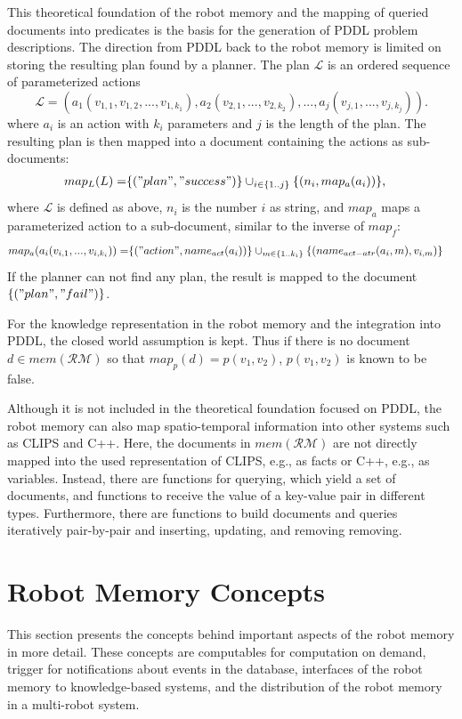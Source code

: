 This theoretical foundation of the robot memory and the mapping of
queried documents into predicates is the basis for the generation of
PDDL problem descriptions. The direction from PDDL back to the robot
memory is limited on storing the resulting plan found by a
planner. The plan $\mathcal{L}$ is an ordered sequence of
parameterized actions
$$\mathcal{L}=(a_1(v_{1,1},v_{1,2},...,v_{1,k_1}),a_2(v_{2,1},...,v_{2,k_2}),...,a_j(v_{j,1},...,v_{j,k_j})) \text{.}$$
where $a_i$ is an action with $k_i$ parameters and $j$ is the length
of the plan. The resulting plan is then mapped into a document
containing the actions as sub-documents:
\begin{align*}
  map_L(L)=&\{("plan", "success")\} \cup_{i \in \{1..j\}}\{(n_i, map_a(a_i))\} \text{,}
\end{align*}
where $\mathcal{L}$ is defined as above, $n_i$ is the number $i$ as
string, and $map_a$ maps a parameterized action to a sub-document,
similar to the inverse of $map_f$:
\begin{align*}
  map_a(a_i(v_{i,1},...,v_{i,k_i}))= &\{("action", name_{act}(a_i))\} 
\cup_{m \in \{1..k_i\}}\{(name_{act-atr}(a_i,m), v_{i,m})\}
\end{align*}
If the planner can not find any plan, the result is mapped to the
document $\{("plan", "fail")\}$.

For the knowledge representation in the robot memory and the
integration into PDDL, the closed world assumption is kept. Thus if
there is no document $d\in mem(\mathcal{RM})$ so that
$map_p(d)=p(v_1,v_2)$, $p(v_1,v_2)$ is known to be false.

Although it is not included in the theoretical foundation focused on
PDDL, the robot memory can also map spatio-temporal information into
other systems such as CLIPS and C++. Here, the documents in
$mem(\mathcal{RM})$ are not directly mapped into the used
representation of CLIPS, e.g., as facts or C++, e.g., as
variables. Instead, there are functions for querying, which yield a
set of documents, and functions to receive the value of a key-value
pair in different types. Furthermore, there are functions to build
documents and queries iteratively pair-by-pair and inserting,
updating, and removing removing.

\section{Robot Memory Concepts}
\label{sec:concepts}
This section presents the concepts behind important aspects of the
robot memory in more detail. These concepts are computables for
computation on demand, trigger for notifications about events in the
database, interfaces of the robot memory to knowledge-based systems,
and the distribution of the robot memory in a multi-robot system.

